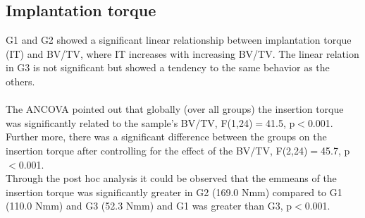 \documentclass[12pt, a4paper, twoside]{report}
\begin{document}
\subsection{Implantation torque}
%
\begin{figure}[H]
\centering 
{}
\label{fig:RM_exp}
\end{figure}
%
\begin{table}[H]
\centering
{}
\caption{Results for the linear regression (RSE: residual standard error, CV: coefficient of variation) of the experimentally evaluated implanting torque values. And the evaluation of the ANCOVA by the emmenas after Bonferroni correction.}
\label{tab:LGrm}
\end{table}
%
G1 and G2 showed a significant linear relationship between implantation torque (IT) and BV/TV, where IT increases with increasing BV/TV. The linear relation in G3 is not significant but showed a tendency to the same behavior as the others.\\
\\
The ANCOVA pointed out that globally (over all groups) the insertion torque was significantly related to the sample's BV$/$TV, F(1,24)$=$41.5, p$<$0.001. Further more, there was a significant difference between the groups on the insertion torque after controlling for the effect of the BV$/$TV, F(2,24)$=$45.7, p$<$0.001.\\
Through the post hoc analysis it could be observed that the emmeans of the insertion torque was significantly greater in G2 (169.0 Nmm) compared to G1 (110.0 Nmm) and G3 (52.3 Nmm) and G1 was greater than G3, p$<$0.001.
%
%
%
\end{document}
